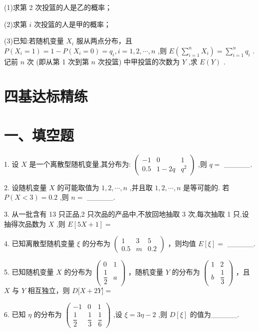 (1)求第 2 次投篮的人是乙的概率；

(2)求第 $i$ 次投篮的人是甲的概率；

(3)已知:若随机变量 ${X}_{i}$ 服从两点分布，且 $P\left( {{X}_{i} = 1}\right)  = 1 - P\left( {{X}_{i} = 0}\right)  = {q}_{i},i = 1,2,\cdots ,n$ ,则 $E\left( {\mathop{\sum }\limits_{{i = 1}}^{n}{X}_{i}}\right)  = \mathop{\sum }\limits_{{i = 1}}^{n}{q}_{i}$ . 记前 $n$ 次 (即从第 1 次到第 $n$ 次投篮) 中甲投篮的次数为 $Y$ ,求 $E\left( Y\right)$ .

\section*{四基达标精练}

\section*{一、填空题}

1. 设 $X$ 是一个离散型随机变量,其分布为: $\left( \begin{matrix}  - 1 & 0 & 1 \\  {0.5} & 1 - {2q} & {q}^{2} \end{matrix}\right)$ ,则 $q =$ \_\_\_\_\_.

2. 设随机变量 $X$ 的可能取值为 $1,2,\cdots ,n$ ,并且取 $1,2,\cdots ,n$ 是等可能的. 若 $P\left( {X < 3}\right)  = {0.2}$ ,则 $n =$ \_\_\_\_\_.

3. 从一批含有 13 只正品,2 只次品的产品中,不放回地抽取 3 次,每次抽取 1 只,设抽得次品数为 $X$ ,则 $E\left\lbrack  {{5X} + 1}\right\rbrack   =$

4. 已知离散型随机变量 $\xi$ 的分布为 $\left( \begin{matrix} 1 & 3 & 5 \\  {0.5} & m & {0.2} \end{matrix}\right)$ ，则均值 $E\left\lbrack  \xi \right\rbrack   =$ \_\_\_\_\_.

5. 已知随机变量 $X$ 的分布为 $\left( \begin{matrix} 0 & 1 \\  \dfrac{1}{2} & a \end{matrix}\right)$ ，随机变量 $Y$ 的分布为 $\left( \begin{matrix} 1 & 2 \\  b & \dfrac{1}{3} \end{matrix}\right)$ ，且 $X$ 与 $Y$ 相互独立，则 $D\lbrack X +  {2Y}\rbrack  =$

6. 已知 $\eta$ 的分布为 $\left( \begin{matrix}  - 1 & 0 & 1 \\  \dfrac{1}{2} & \dfrac{1}{3} & \dfrac{1}{6} \end{matrix}\right)$ ,设 $\xi  = {3\eta } - 2$ ,则 $D\left\lbrack  \xi \right\rbrack$ 的值为\_\_\_\_\_.


